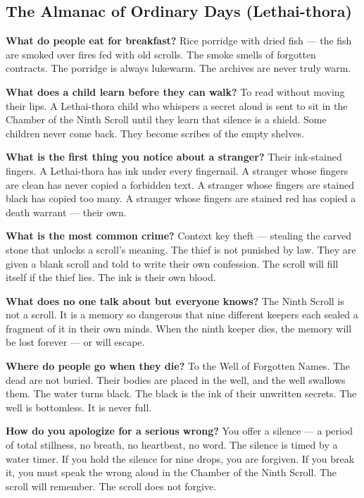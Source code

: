 \subsection*{The Almanac of Ordinary Days (Lethai-thora)}
\begin{almanac}
\textbf{What do people eat for breakfast?} Rice porridge with dried fish --- the fish are smoked over fires fed with old scrolls. The smoke smells of forgotten contracts. The porridge is always lukewarm. The archives are never truly warm.

\textbf{What does a child learn before they can walk?} To read without moving their lips. A Lethai-thora child who whispers a secret aloud is sent to sit in the Chamber of the Ninth Scroll until they learn that silence is a shield. Some children never come back. They become scribes of the empty shelves.

\textbf{What is the first thing you notice about a stranger?} Their ink-stained fingers. A Lethai-thora has ink under every fingernail. A stranger whose fingers are clean has never copied a forbidden text. A stranger whose fingers are stained black has copied too many. A stranger whose fingers are stained red has copied a death warrant --- their own.

\textbf{What is the most common crime?} Context key theft --- stealing the carved stone that unlocks a scroll's meaning. The thief is not punished by law. They are given a blank scroll and told to write their own confession. The scroll will fill itself if the thief lies. The ink is their own blood.

\textbf{What does no one talk about but everyone knows?} The Ninth Scroll is not a scroll. It is a memory so dangerous that nine different keepers each sealed a fragment of it in their own minds. When the ninth keeper dies, the memory will be lost forever --- or will escape.

\textbf{Where do people go when they die?} To the Well of Forgotten Names. The dead are not buried. Their bodies are placed in the well, and the well swallows them. The water turns black. The black is the ink of their unwritten secrets. The well is bottomless. It is never full.

\textbf{How do you apologize for a serious wrong?} You offer a silence --- a period of total stillness, no breath, no heartbeat, no word. The silence is timed by a water timer. If you hold the silence for nine drops, you are forgiven. If you break it, you must speak the wrong aloud in the Chamber of the Ninth Scroll. The scroll will remember. The scroll does not forgive.


\end{almanac}
